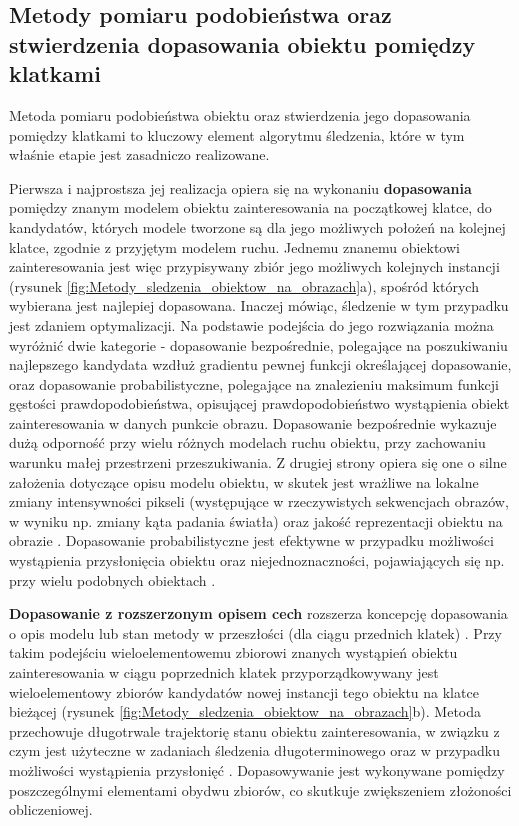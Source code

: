 \subsection{Metody pomiaru podobieństwa oraz stwierdzenia dopasowania obiektu pomiędzy klatkami}
\label{subsec:Metody_pomiaru_podobienstwa_oraz_stwierdzenia_dopasowania_obiektu pomiedzy_klatkami}

Metoda pomiaru podobieństwa obiektu oraz stwierdzenia jego dopasowania pomiędzy klatkami to kluczowy element algorytmu śledzenia, które w tym właśnie etapie jest zasadniczo realizowane.

Pierwsza i najprostsza jej realizacja opiera się na wykonaniu \textbf{dopasowania} pomiędzy znanym modelem obiektu zainteresowania na początkowej klatce, do kandydatów, których modele tworzone są dla jego możliwych położeń na kolejnej klatce, zgodnie z przyjętym modelem ruchu. Jednemu znanemu obiektowi zainteresowania jest więc przypisywany zbiór jego możliwych kolejnych instancji (rysunek \ref{fig:Metody_sledzenia_obiektow_na_obrazach}a), spośród których wybierana jest najlepiej dopasowana.
Inaczej mówiąc, śledzenie w tym przypadku jest zdaniem optymalizacji. Na podstawie podejścia do jego rozwiązania można wyróżnić dwie kategorie - dopasowanie bezpośrednie, polegające na poszukiwaniu najlepszego kandydata wzdłuż gradientu pewnej funkcji określającej dopasowanie, oraz dopasowanie probabilistyczne, polegające na znalezieniu maksimum funkcji gęstości prawdopodobieństwa, opisującej prawdopodobieństwo wystąpienia obiekt zainteresowania w danych punkcie obrazu. Dopasowanie bezpośrednie wykazuje dużą odporność przy wielu różnych modelach ruchu obiektu, przy zachowaniu warunku małej przestrzeni przeszukiwania. Z drugiej strony opiera się one o silne założenia dotyczące opisu modelu obiektu, w skutek jest wrażliwe na lokalne zmiany intensywności pikseli (występujące w rzeczywistych sekwencjach obrazów, w wyniku np. zmiany kąta padania światła) oraz jakość reprezentacji obiektu na obrazie \cite{Smeulders2010}. Dopasowanie probabilistyczne jest efektywne w przypadku możliwości wystąpienia przysłonięcia obiektu oraz niejednoznaczności, pojawiających się np. przy wielu podobnych obiektach \cite{Smeulders2010}.

\textbf{Dopasowanie z rozszerzonym opisem cech} rozszerza koncepcję dopasowania o opis modelu lub stan metody w przeszłości (dla ciągu przednich klatek) \cite{Smeulders2010}. Przy takim podejściu wieloelementowemu zbiorowi znanych wystąpień obiektu zainteresowania w ciągu poprzednich klatek przyporządkowywany jest wieloelementowy zbiorów kandydatów nowej instancji tego obiektu na klatce bieżącej (rysunek \ref{fig:Metody_sledzenia_obiektow_na_obrazach}b). Metoda przechowuje długotrwale trajektorię stanu obiektu zainteresowania, w związku z czym jest użyteczne w zadaniach śledzenia długoterminowego oraz w przypadku możliwości wystąpienia przysłonięć \cite{Smeulders2010}. Dopasowywanie jest wykonywane pomiędzy poszczególnymi elementami obydwu zbiorów, co skutkuje zwiększeniem złożoności obliczeniowej. 

